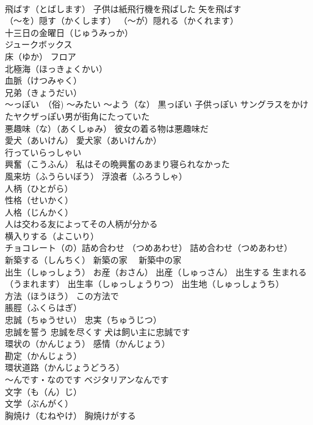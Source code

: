 \documentclass[8pt]{extreport}
\begin{document}
\begin{CJK}{UTF8}{min}
\\	飛ばす（とばします） 子供は紙飛行機を飛ばした 矢を飛ばす
\\	（～を）隠す（かくします） （～が）隠れる（かくれます）
\\	十三日の金曜日（じゅうみっか）
\\	ジュークボックス
\\	床（ゆか） フロア
\\	北極海（ほっきょくかい）
\\	血脈（けつみゃく） 
\\	兄弟（きょうだい）
\\	～っぽい　（俗) ～みたい ～よう（な） 黒っぽい 子供っぽい サングラスをかけたヤクザっぽい男が街角にたっていた
\\	悪趣味（な）（あくしゅみ） 彼女の着る物は悪趣味だ
\\	愛犬（あいけん） 愛犬家（あいけんか）
\\	行っていらっしゃい
\\	興奮（こうふん） 私はその晩興奮のあまり寝られなかった
\\	風来坊（ふうらいぼう） 浮浪者（ふろうしゃ）
\\	人柄（ひとがら） 
\\	性格（せいかく） 
\\	人格（じんかく） 
\\	人は交わる友によってその人柄が分かる
\\	横入りする（よこいり）
\\	チョコレート（の）詰め合わせ （つめあわせ） 詰め合わせ（つめあわせ） 
\\	新築する（しんちく） 新築の家　 新築中の家
\\	出生（しゅっしょう） お産（おさん） 出産（しゅっさん） 出生する 生まれる（うまれます） 出生率（しゅっしょうりつ） 出生地（しゅっしょうち）
\\	方法（ほうほう） この方法で
\\	脹脛（ふくらはぎ）
\\	忠誠（ちゅうせい） 忠実（ちゅうじつ）
\\	忠誠を誓う 忠誠を尽くす 犬は飼い主に忠誠です
\\	環状の（かんじょう） 感情（かんじょう） 
\\	勘定（かんじょう）
\\	環状道路（かんじょうどうろ）
\\	～んです・なのです ベジタリアンなんです
\\	文字（も（ん）じ）
\\	文学（ぶんがく）
\\	胸焼け（むねやけ） 胸焼けがする

\end{CJK}
\end{document}
